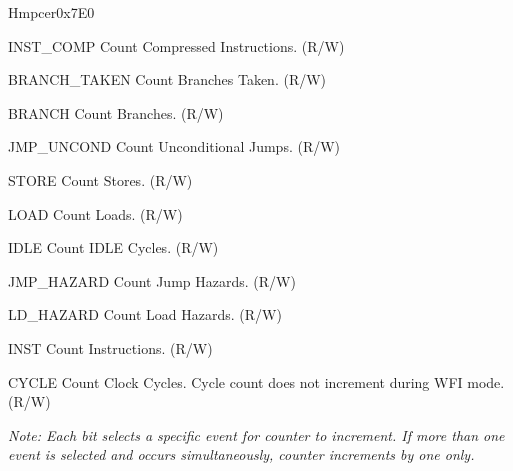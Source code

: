 \begin{register}{H}{mpcer}{0x7E0}\label{regdesc:MPCER}
%
%
%
%
%
%
%
%
%
%
%
%
\regnewline%
\begin{regdesc}\begin{reglist}
\label{fielddesc:INST_COMP}\item [INST\_COMP] Count Compressed Instructions. (R/W)
\label{fielddesc:BRANCH_TAKEN}\item [BRANCH\_TAKEN] Count Branches Taken. (R/W)
\label{fielddesc:BRANCH}\item [BRANCH] Count Branches. (R/W)
\label{fielddesc:JUMP_UNCONDITIONAL}\item [JMP\_UNCOND] Count Unconditional Jumps. (R/W)
\label{fielddesc:STORE}\item [STORE] Count Stores. (R/W)
\label{fielddesc:LOAD}\item  [LOAD] Count Loads. (R/W)
\label{fielddesc:IDLE}\item  [IDLE] Count IDLE Cycles. (R/W)
\label{fielddesc:JUMP_HAZARDS}\item  [JMP\_HAZARD] Count Jump Hazards. (R/W)
\label{fielddesc:LOAD_HAZARDS}\item  [LD\_HAZARD] Count Load Hazards. (R/W)
\label{fielddesc:INSTRUCTION}\item  [INST] Count Instructions. (R/W)
\label{fielddesc:CYCLES}\item  [CYCLE] Count Clock Cycles. Cycle count does not increment during WFI mode. (R/W)

\textit{Note: Each bit selects a specific event for counter to increment. If more than one event is selected and occurs simultaneously, counter increments by one only.}

\end{reglist}\end{regdesc}
\end{register}

